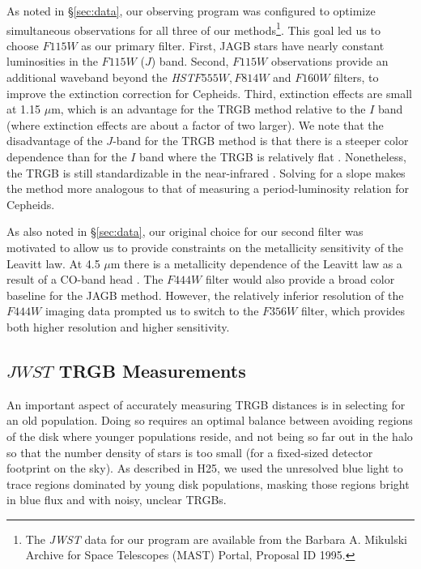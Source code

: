 \documentclass[12pt,modern]{aastex631}
\newcommand{\hst}{\emph{HST}\xspace}
\begin{document}
 
As noted in \S\ref{sec:data}, our observing program was configured to optimize simultaneous observations for all three of our methods\footnote{The {\it JWST} data for our program are available from the Barbara A. Mikulski Archive for Space Telescopes (MAST) Portal, Proposal ID 1995.}. This goal led us to choose  $F115W$ as our primary filter. First, JAGB stars have nearly constant luminosities in the $F115W$ ($J$) band. Second, $F115W$ observations provide an additional waveband beyond the \hst $F555W, F814W$ and $F160W$ filters, to improve the extinction correction for Cepheids. Third, extinction effects are small at 1.15 $\mu$m, which is an advantage for the TRGB method relative to the $I$ band (where extinction effects are about a factor of two larger).   We note that the disadvantage of the $J$-band for the TRGB method is that there is a steeper color dependence than for the $I$ band where the TRGB is relatively flat \citep[e.g.,][]{lee_1993}. Nonetheless, the TRGB is still standardizable in the near-infrared \citep[e.g.,][]{dalcanton_2012, madore_2018, hoyt_2018, durbin_2020,  newman_2024b, hoyt_2025a}. Solving for a slope makes the method more analogous to that of measuring a period-luminosity relation for Cepheids.

As also noted in \S\ref{sec:data}, our original choice for our second filter was motivated to allow us to provide constraints on the metallicity sensitivity of the Leavitt law. At 4.5 $\mu$m there is a  metallicity dependence of the Leavitt law as a result of a CO-band head \citep{scowcroft_2011}. The $F444W$ filter would also provide a broad color baseline for the JAGB method.  However, the relatively inferior resolution of the $F444W$ imaging data prompted us to switch to the $F356W$ filter, which provides both higher resolution and higher sensitivity. 

\subsection{$JWST$ TRGB Measurements}
\label{sec:jwsttrgb}


An important aspect of accurately measuring  TRGB distances is in selecting for an old population. Doing so requires an optimal balance between avoiding regions of the disk where younger populations reside, and not being so far out in the halo so that the number density of stars is too small  (for a fixed-sized detector footprint on the sky).  As described in H25, we used the unresolved blue light to trace regions dominated by young disk populations, masking those regions bright in blue flux and with noisy, unclear TRGBs.
\end{document}

